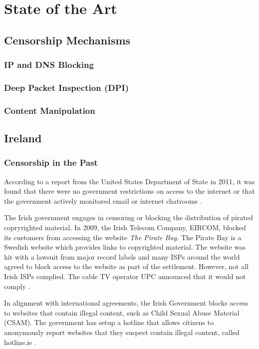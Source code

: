 \chapter{State of the Art}
\section{Censorship Mechanisms}

\subsection{IP and DNS Blocking}

\subsection{Deep Packet Inspection (DPI)}

\subsection{Content Manipulation}

\section{Ireland}

\subsection{Censorship in the Past}

According to a report from the United States Department of State in 2011, it was found that there were no government restrictions on access to the internet or that the government actively monitored email or internet chatrooms \cite{stateTechnicalDifficulties}.

The Irish government engages in censoring or blocking the distribution of pirated copryrighted material. In 2009, the Irish Telecom Company, EIRCOM, blocked its customers from accessing the website \textit{The Pirate Bay}. The Pirate Bay is a Swedish website which provides links to copyrighted material. The website was hit with a lawsuit from major record labels and many ISPs around the world agreed to block access to the website as part of the settlement. However, not all Irish ISPs complied. The cable TV operator UPC announced that it would not comply \cite{irishtimesEircomBlock}. 

In alignment with international agreements, the Irish Government blocks access to websites that contain illegal content, such as Child Sexual Abuse Material (CSAM). The government has setup a hotline that allows citizens to anonymously report websites that they suspect contain illegal content, called hotline.ie \cite{hotlineAboutx2013}.

